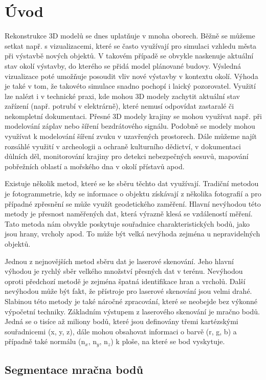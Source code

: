 \documentclass[11pt,twoside,a4paper]{book}
\begin{document}
\chapter{Úvod}
Rekonstrukce 3D modelů se dnes uplatňuje v mnoha oborech. Běžně se můžeme setkat např. s vizualizacemi, které
se často využívají pro simulaci vzhledu města při výstavbě nových objektů. V takovém případě se obvykle
naskenuje aktuální stav okolí výstavby, do kterého se přidá model plánované budovy. Výsledná vizualizace poté
umožňuje posoudit vliv nové výstavby v kontextu okolí. Výhoda je také v tom, že takovéto simulace snadno pochopí i
laický pozorovatel. Využití lze nalézt i v technické praxi, kde mohou 3D modely zachytit aktuální stav
zařízení (např. potrubí v elektrárně), které nemusí odpovídat zastaralé či nekompletní dokumentaci. Přesné 3D
modely krajiny se mohou využívat např. při modelování záplav nebo šíření bezdrátového signálu. Podobně se
modely mohou využívat k modelování šíření zvuku v uzavřených prostorech. Dále můžeme najít rozsáhlé využití v
archeologii a ochraně kulturního dědictví, v dokumentaci důlních děl, monitorování krajiny pro detekci
nebezpečných sesuvů, mapování pobřežních oblastí a mořského dna v okolí přístavů apod.

Existuje několik metod, které se ke sběru těchto dat využívají. Tradiční metodou je fotogrammetrie, kdy se
informace o objektu získávají z několika fotografií a pro případné zpřesnění se může využít geodetického
zaměření. Hlavní nevýhodou této metody je přesnost naměřených dat, která výrazně klesá se vzdáleností měření.
Tato metoda nám obvykle poskytuje souřadnice charakteristických bodů, jako jsou hrany, vrcholy apod. To může
být velká nevýhoda zejména u nepravidelných objektů.

Jednou z nejnovějších metod sběru dat je laserové skenování. Jeho hlavní výhodou je rychlý sběr velkého
množství přesných dat v terénu. Nevýhodou oproti předchozí metodě je zejména špatná identifikace hran a
vrcholů. Další nevýhodou může být fakt, že přístroje pro laserové skenování jsou velmi drahé. Slabinou této
metody je také náročné zpracování, které se neobejde bez výkonné výpočetní techniky. Základním výstupem z
laserového skenování je mračno bodů. Jedná se o tisíce až miliony bodů, které jsou definovány třemi
kartézskými souřadnicemi (x, y, z), dále mohou obsahovat informaci o barvě (r, g, b) a případně také normálu
(n$_x$, n$_y$, n$_z$) k ploše, na které se bod vyskytuje.

\section{Segmentace mračna bodů}
\end{document}
